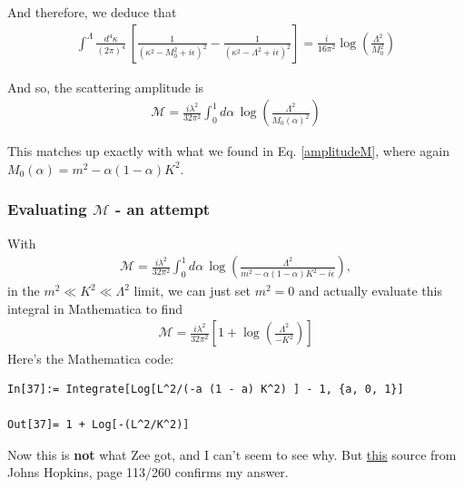\documentclass{book}
\theoremstyle{definition}
\newcommand{\f}[2]{\frac{#1}{#2}}
\newcommand{\lp}{\left(}
\newcommand{\rp}{\right)}
\newcommand{\lb}{\left[}
\newcommand{\rb}{\right]}
\begin{document}
And therefore, we deduce that
\begin{align}
\boxed{\int^\Lambda \f{d^4\kappa}{(2\pi)^4}   \, \lb\f{1}{(\kappa^2 - M_0^2 + i\epsilon )^2} - \f{1}{(\kappa^2 - \Lambda^2 + i\epsilon)^2}\rb = \f{i}{16\pi^2}\log\lp \f{\Lambda^2}{M_0^2} \rp}
\end{align}


And so, the scattering amplitude is
\begin{align}
\boxed{\mathcal{M} = \f{i\lambda^2}{32\pi^2}\int^1_0 d\alpha\, \log\lp \f{\Lambda^2}{M_0(\alpha)^2} \rp }
\end{align}

This matches up exactly with what we found in Eq. \eqref{amplitudeM}, where again $M_0(\alpha) = m^2- \alpha(1-\alpha)K^2$.












\subsubsection{Evaluating $\mathcal{M}$ - an attempt}

With
\begin{align}
\mathcal{M}  = \f{i\lambda^2}{32\pi^2} \int^1_0 d\alpha\,  \log\lp \f{\Lambda^2}{m^2  - \alpha(1 - \alpha)K^2 - i\epsilon} \rp ,
\end{align}
in the $m^2 \ll K^2 \ll \Lambda^2$ limit, we can just set $m^2 = 0$ and actually evaluate this integral in Mathematica to find
\begin{align}
\boxed{\mathcal{M} = \f{i\lambda^2}{32\pi^2} \lb 1 + \log\lp \f{\Lambda^2}{-K^2}\rp \rb}
\end{align}
Here's the Mathematica code:
\begin{lstlisting}
In[37]:= Integrate[Log[L^2/(-a (1 - a) K^2) ] - 1, {a, 0, 1}]

Out[37]= 1 + Log[-(L^2/K^2)]
\end{lstlisting}


Now this is \textbf{not} what Zee got, and I can't seem to see why. But \href{http://sites.krieger.jhu.edu/jared-kaplan/files/2016/05/QFTNotes.pdf}{\underline{this}} source from Johns Hopkins, page 113/260 confirms my answer.  
\end{document}
